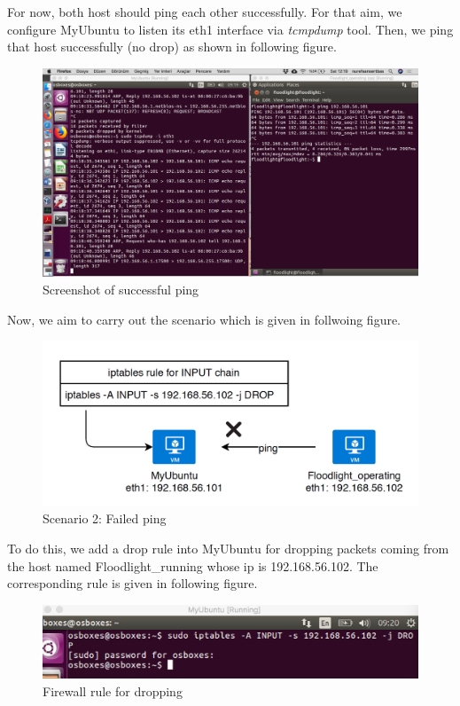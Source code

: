 \documentclass[paper=a4, fontsize=11pt]{scrartcl}
\numberwithin{equation}{section}		%
\numberwithin{figure}{section}			%
\numberwithin{table}{section}				%
\begin{document}
For now, both host should ping each other successfully. For that aim, we configure MyUbuntu to listen its eth1 interface via \textit{tcmpdump} tool. Then, we ping that host successfully (no drop) as shown in following figure.
\begin{figure}[H]
\centering
\includegraphics[width=\textwidth]{img/4.png}
\caption{Screenshot of successful ping}
\end{figure}

Now, we aim to carry out the scenario which is given in follwoing figure.

\begin{figure}[H]
\centering
\includegraphics[width=\textwidth]{img/10.png}
\caption{Scenario 2: Failed ping}
\end{figure}

To do this, we add a drop rule into MyUbuntu for dropping packets coming from the host named Floodlight\_running whose ip is 192.168.56.102. The corresponding rule is given in following figure.
\begin{figure}[H]
\centering
\includegraphics[width=\textwidth]{img/5.png}
\caption{Firewall rule for dropping}
\end{figure}
\end{document}

